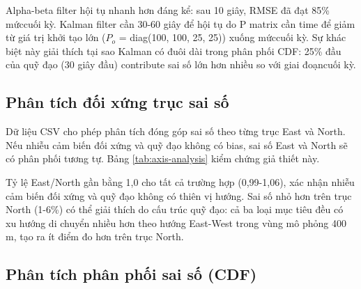 Alpha-beta filter hội tụ nhanh hơn đáng kể: sau 10 giây, RMSE đã đạt 85\% mứccuối kỳ. Kalman filter cần 30-60 giây để hội tụ do P matrix cần time để giảm từ giá trị khởi tạo lớn ($P_o$ = diag(100, 100, 25, 25)) xuống mứccuối kỳ. Sự khác biệt này giải thích tại sao Kalman có đuôi dài trong phân phối CDF: 25\% đầu của quỹ đạo (30 giây đầu) contribute sai số lớn hơn nhiều so với giai đoạncuối kỳ.

\subsection{Phân tích đối xứng trục sai số}

\hspace{0.5cm} Dữ liệu CSV cho phép phân tích đóng góp sai số theo từng trục East và North. Nếu nhiễu cảm biến đối xứng và quỹ đạo không có bias, sai số East và North sẽ có phân phối tương tự. Bảng \ref{tab:axis-analysis} kiểm chứng giả thiết này.

\begin{table}[H]
\centering
{}
\caption{Phân tích sai số theo trục East và North}
\label{tab:axis-analysis}
\end{table}

Tỷ lệ East/North gần bằng 1,0 cho tất cả trường hợp (0,99-1,06), xác nhận nhiễu cảm biến đối xứng và quỹ đạo không có thiên vị hướng. Sai số nhỏ hơn trên trục North (1-6\%) có thể giải thích do cấu trúc quỹ đạo: cả ba loại mục tiêu đều có xu hướng di chuyển nhiều hơn theo hướng East-West trong vùng mô phỏng 400 m, tạo ra ít điểm đo hơn trên trục North.

\subsection{Phân tích phân phối sai số (CDF)}

